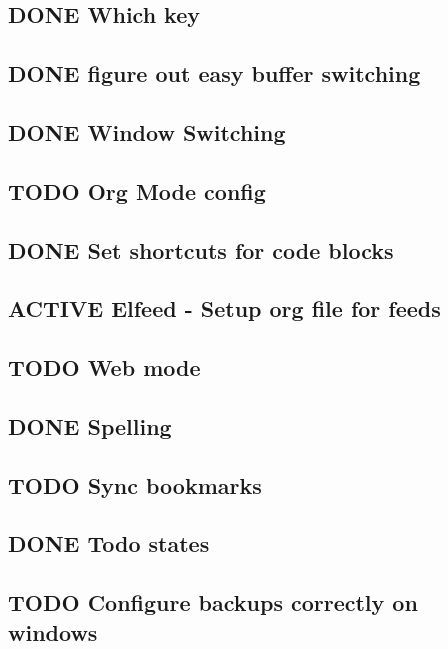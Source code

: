 \documentclass[11pt]{article}
\begin{document}
\subsection{{\bfseries\sffamily DONE} Which key}
\label{sec:org8f35428}
\subsection{{\bfseries\sffamily DONE} figure out easy buffer switching}
\label{sec:orge6aa78b}
\subsection{{\bfseries\sffamily DONE} Window Switching}
\label{sec:orgd6af4b9}
\subsection{{\bfseries\sffamily TODO} Org Mode config}
\label{sec:org0f5e02f}
\subsection{{\bfseries\sffamily DONE} Set shortcuts for code blocks}
\label{sec:org50d0817}
\subsection{{\bfseries\sffamily ACTIVE} Elfeed - Setup org file for feeds}
\label{sec:orgf8694e4}
\subsection{{\bfseries\sffamily TODO} Web mode}
\label{sec:org124aa64}
\subsection{{\bfseries\sffamily DONE} Spelling}
\label{sec:org0845a15}
\subsection{{\bfseries\sffamily TODO} Sync bookmarks}
\label{sec:orgbecaabc}
\subsection{{\bfseries\sffamily DONE} Todo states}
\label{sec:orgb5ab303}
\subsection{{\bfseries\sffamily TODO} Configure backups correctly on windows}
\label{sec:org981f47d}
\end{document}
